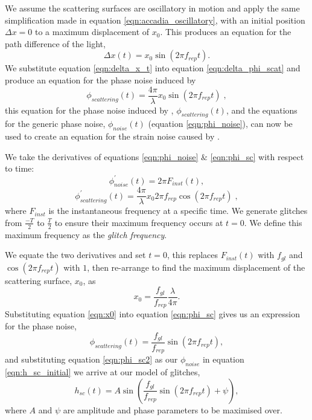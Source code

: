 We assume the scattering surfaces are oscillatory in motion and apply the same simplification made in equation \ref{eqn:accadia_oscillatory}, with an initial position $\Delta x = 0$ to a maximum displacement of $x_{0}$. This produces an equation for the path difference of the light,
%
\begin{equation}
  \Delta x(t) = x_{0} \sin(2 \pi f_{rep} t).
  \label{eqn:delta_x_t}
\end{equation}
%
We substitute equation \ref{eqn:delta_x_t} into equation \ref{eqn:delta_phi_scat} and produce an equation for the phase noise induced by \scl{}
%
\begin{equation}
  \phi_{scattering}(t) = \frac{4 \pi}{\lambda} x_{0} \sin(2 \pi f_{rep} t) \;,
  \label{eqn:phi_sc}
\end{equation}
%
this equation for the phase noise induced by \scl{}, $\phi_{scattering}(t)$, and the equations for the generic phase noise, $\phi_{noise}(t)$ (equation \ref{eqn:phi_noise}), can now be used to create an equation for the strain noise caused by \scl{}.

We take the derivatives of equations \ref{eqn:phi_noise} $\&$ \ref{eqn:phi_sc} with respect to time:
%
\begin{equation}
  \phi_{noise} ^\prime (t) = 2 \pi F_{inst} (t),
\end{equation}
%
\begin{equation}
  \phi_{scattering} ^\prime (t) = \frac{4 \pi}{\lambda} x_{0} 2 \pi f_{rep} \cos(2 \pi f_{rep} t) \;,
\end{equation}
%
where $F_{inst}$ is the instantaneous frequency at a specific time. We generate \scl{} glitches from $\frac{-T}{2}$ to $\frac{T}{2}$ to ensure their maximum frequency occurs at $t = 0$. We define this maximum frequency as the \emph{glitch frequency}.

We equate the two derivatives and set $t = 0$, this replaces $F_{inst}(t)$ with $f_{gl}$ and $\cos(2\pi f_{rep} t)$ with $1$, then re-arrange to find the maximum displacement of the scattering surface, $x_{0}$, as
%
\begin{equation}
  x_{0} = \frac{f_{gl}}{f_{rep}} \frac{\lambda}{4 \pi}.
  \label{eqn:x0}
\end{equation}
%
Substituting equation \ref{eqn:x0} into equation \ref{eqn:phi_sc} gives us an expression for the \scl{} phase noise,
%
\begin{equation}
  \phi_{scattering}(t) = \frac{f_{gl}}{f_{rep}} \sin(2 \pi f_{rep} t),
  \label{eqn:phi_sc2}
\end{equation}
%
and substituting equation \ref{eqn:phi_sc2} as our $\phi_{noise}$ in equation \ref{eqn:h_sc_initial} we arrive at our model of \scl{} glitches,
%
\begin{equation}
  h_{sc}(t) = A \sin\left(\frac{f_{gl}}{f_{rep}} \sin(2 \pi f_{rep} t) + \psi\right),
  \label{eqn:model}
\end{equation}
%
where $A$ and $\psi$ are amplitude and phase parameters to be maximised over.

